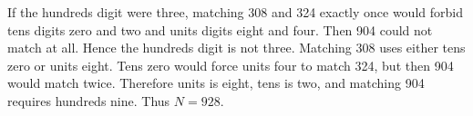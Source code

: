 If the hundreds digit were three, matching 308 and 324 exactly once would forbid tens digits zero and two and units digits eight and four. Then 904 could not match at all. Hence the hundreds digit is not three. Matching 308 uses either tens zero or units eight. Tens zero would force units four to match 324, but then 904 would match twice. Therefore units is eight, tens is two, and matching 904 requires hundreds nine. Thus $\boxed{N=928}$.
